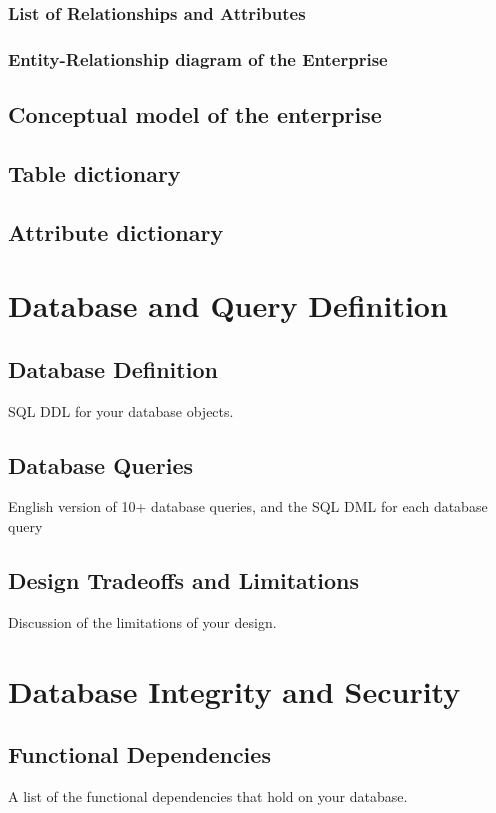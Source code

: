 \documentclass[11pt, a4paper]{report}
\begin{document}
\subsection{List of Relationships and Attributes}
\subsection{Entity-Relationship diagram of the Enterprise}

\section{Conceptual model of the enterprise}
\section{Table dictionary}
\section{Attribute dictionary}

\chapter{Database and Query Definition}

\section{Database Definition}
    SQL DDL for your database objects.
\section{Database Queries}
    English version of 10+ database queries, and the SQL DML for each database query
\section{Design Tradeoffs and Limitations}
    Discussion of the limitations of your design.

\chapter{Database Integrity and Security}
\section{Functional Dependencies}
    A list of the functional dependencies that hold on your database.
\end{document}
